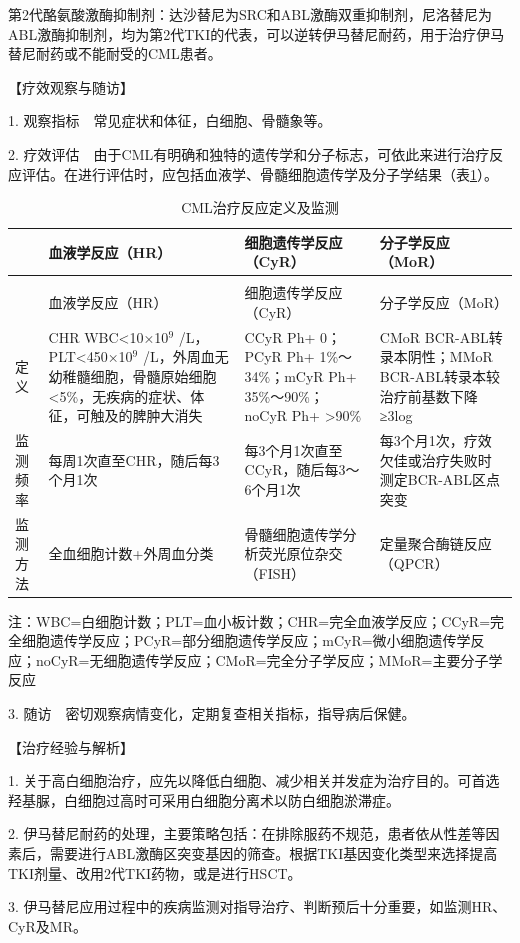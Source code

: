 第2代酪氨酸激酶抑制剂：达沙替尼为SRC和ABL激酶双重抑制剂，尼洛替尼为ABL激酶抑制剂，均为第2代TKI的代表，可以逆转伊马替尼耐药，用于治疗伊马替尼耐药或不能耐受的CML患者。

【疗效观察与随访】

1. 观察指标　常见症状和体征，白细胞、骨髓象等。

2.
疗效评估　由于CML有明确和独特的遗传学和分子标志，可依此来进行治疗反应评估。在进行评估时，应包括血液学、骨髓细胞遗传学及分子学结果（表\ref{tab5-1-1}）。

\begin{longtable}[]{@{}lp{4cm}p{4cm}p{4cm}@{}}
    \caption{CML治疗反应定义及监测}
    \label{tab5-1-1}\\
\toprule
& 血液学反应（HR） & 细胞遗传学反应（CyR） &
分子学反应（MoR）\tabularnewline
\midrule
\endfirsthead
\caption[]{CML治疗反应定义及监测}\\
\toprule
& 血液学反应（HR） & 细胞遗传学反应（CyR） &
分子学反应（MoR）\tabularnewline
\midrule
\endhead
\bottomrule
\endfoot
定义 & CHR WBC<10×10$^{9}$ /L，PLT<450×10$^{9}$
/L，外周血无幼稚髓细胞，骨髓原始细胞<5\%，无疾病的症状、体征，可触及的脾肿大消失
& CCyR Ph{+} 0；PCyR Ph{+}
1\%～34\%；mCyR Ph{+}
35\%～90\%；noCyR Ph{+} \textgreater{}90\%
& CMoR BCR-ABL转录本阴性；MMoR
BCR-ABL转录本较治疗前基数下降≥3log\tabularnewline
监测频率 & 每周1次直至CHR，随后每3个月1次 &
每3个月1次直至CCyR，随后每3～6个月1次 &
每3个月1次，疗效欠佳或治疗失败时测定BCR-ABL区点突变\tabularnewline
监测方法 & 全血细胞计数+外周血分类 &
骨髓细胞遗传学分析荧光原位杂交（FISH） &
定量聚合酶链反应（QPCR）\tabularnewline
\end{longtable}

注：WBC=白细胞计数；PLT=血小板计数；CHR=完全血液学反应；CCyR=完全细胞遗传学反应；PCyR=部分细胞遗传学反应；mCyR=微小细胞遗传学反应；noCyR=无细胞遗传学反应；CMoR=完全分子学反应；MMoR=主要分子学反应

3. 随访　密切观察病情变化，定期复查相关指标，指导病后保健。

【治疗经验与解析】

1.
关于高白细胞治疗，应先以降低白细胞、减少相关并发症为治疗目的。可首选羟基脲，白细胞过高时可采用白细胞分离术以防白细胞淤滞症。

2.
伊马替尼耐药的处理，主要策略包括：在排除服药不规范，患者依从性差等因素后，需要进行ABL激酶区突变基因的筛查。根据TKI基因变化类型来选择提高TKI剂量、改用2代TKI药物，或是进行HSCT。

3.
伊马替尼应用过程中的疾病监测对指导治疗、判断预后十分重要，如监测HR、CyR及MR。

